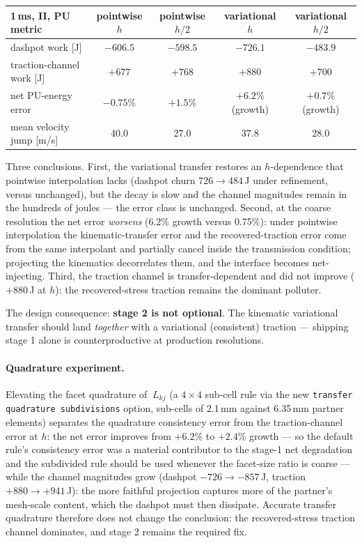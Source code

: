 \documentclass[11pt]{article}
\begin{document}
\begin{center}
\small
\begin{tabular}{lcccc}
\toprule
1\,ms, II, PU metric & pointwise $h$ & pointwise $h/2$ &
  variational $h$ & variational $h/2$ \\
\midrule
dashpot work [J] & $-606.5$ & $-598.5$ & $-726.1$ & $-483.9$ \\
traction-channel work [J] & $+677$ & $+768$ & $+880$ & $+700$ \\
net PU-energy error & $-0.75$\% & $+1.5$\% & $+6.2$\% (growth) & $+0.7$\% (growth) \\
mean velocity jump [m/s] & 40.0 & 27.0 & 37.8 & 28.0 \\
\bottomrule
\end{tabular}
\end{center}

Three conclusions.  First, the variational transfer restores an
$h$-dependence that pointwise interpolation lacks (dashpot churn
$726 \to 484$\,J under refinement, versus unchanged), but the decay is
slow and the channel magnitudes remain in the hundreds of joules ---
the error class is unchanged.  Second, at the coarse resolution the
net error \emph{worsens} (6.2\% growth versus 0.75\%): under pointwise
interpolation the kinematic-transfer error and the recovered-traction
error come from the same interpolant and partially cancel inside the
transmission condition; projecting the kinematics decorrelates them,
and the interface becomes net-injecting.  Third, the traction channel
is transfer-dependent and did not improve ($+880$\,J at $h$): the
recovered-stress traction remains the dominant polluter.

The design consequence: \textbf{stage 2 is not optional}.  The
kinematic variational transfer should land \emph{together} with a
variational (consistent) traction --- shipping stage 1 alone is
counterproductive at production resolutions.

\paragraph{Quadrature experiment.}  Elevating the facet quadrature of
$~L_{kj}$ (a $4\times4$ sub-cell rule via the new
\texttt{transfer quadrature subdivisions} option, sub-cells of
2.1\,mm against 6.35\,mm partner elements) separates the quadrature
consistency error from the traction-channel error at $h$: the net
error improves from $+6.2$\% to $+2.4$\% growth --- so the default
rule's consistency error was a material contributor to the stage-1 net
degradation and the subdivided rule should be used whenever the
facet-size ratio is coarse --- while the channel magnitudes grow
(dashpot $-726 \to -857$\,J, traction $+880 \to +941$\,J): the more
faithful projection captures more of the partner's mesh-scale content,
which the dashpot must then dissipate.  Accurate transfer quadrature
therefore does not change the conclusion: the recovered-stress
traction channel dominates, and stage 2 remains the required fix.
\end{document}
